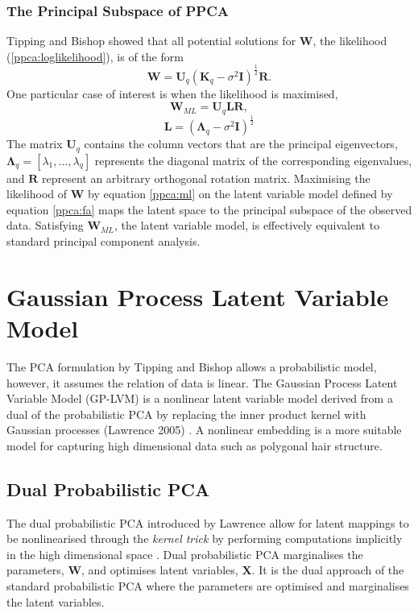 \documentclass[ %
author={Dillon Keith Diep},
supervisor={Dr. Carl Henrik Ek},
degree={MEng},
title={ART-CG Hair:},
subtitle={Assisted Real-time Content Generation of Stylised Virtual Hair},
type={Research},
year={2017} ]{dissertation}
\begin{document}
	\subsubsection{The Principal Subspace of PPCA}
	Tipping and Bishop showed that all potential solutions for $\bm{W}$, the likelihood (\ref{ppca:loglikelihood}), is of the form \cite{ppca} $$\bm{W}=\bm{U}_q(\bm{K}_q-\sigma^2\bm{I})^\frac{1}{2}\bm{R}.$$
	One particular case of interest is when the likelihood is maximised,
	\begin{equation} \label{ppca:ml}
	\bm{W}_{ML}=\bm{U}_q\bm{LR},
	\end{equation}
	$$\bm{L}=(\bm{\Lambda}_q-\sigma^2\bm{I})^{\frac{1}{2}}$$
	The matrix $\bm{U}_q$ contains the column vectors that are the principal eigenvectors, $\bm{\Lambda}_q=[\lambda_1,...,\lambda_q]$ represents the diagonal matrix of the corresponding eigenvalues, and $\bm{R}$ represent an arbitrary orthogonal rotation matrix. 
	Maximising the likelihood of $\bm{W}$ by equation \ref{ppca:ml} on the latent variable model defined by equation \ref{ppca:fa} maps the latent space to the principal subspace of the observed data. Satisfying $\bm{W}_{ML}$, the latent variable model, is effectively equivalent to standard principal component analysis.
	
	\section{Gaussian Process Latent Variable Model}
	The PCA formulation by Tipping and Bishop allows a probabilistic model, however, it assumes the relation of data is linear. The Gaussian Process Latent Variable Model (GP-LVM) is a nonlinear latent variable model derived from a dual of the probabilistic PCA by replacing the inner product kernel with Gaussian processes (Lawrence 2005) \cite{gplvm}. A nonlinear embedding is a more suitable model for capturing high dimensional data such as polygonal hair structure.
	
	\subsection{Dual Probabilistic PCA}
	The dual probabilistic PCA introduced by Lawrence allow for latent mappings to be nonlinearised through the \textit{kernel trick} by performing computations implicitly in the high dimensional space \cite[p.8]{gp}. Dual probabilistic PCA marginalises the parameters, $\bm{W}$, and optimises latent variables, $\bm{X}$. It is the dual approach of the standard probabilistic PCA where the parameters are optimised and marginalises the latent variables.
	
\end{document}
